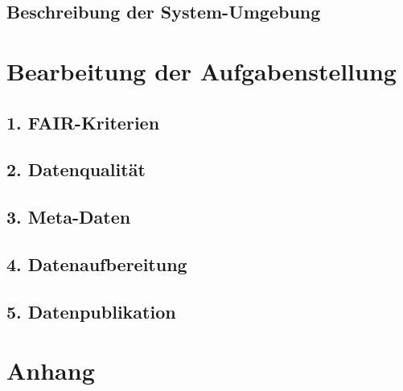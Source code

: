 \documentclass[12pt,a4paper,toc=bibliographynumbered,toc=indenttextentries]{scrreprt}
\begin{document}
		\section{Beschreibung der System-Umgebung}
		
		
	\chapter{Bearbeitung der Aufgabenstellung}
		
		\section*{1. FAIR-Kriterien}
	
		\section*{2. Datenqualität}
	
		\section*{3. Meta-Daten}
	
		\section*{4. Datenaufbereitung}
	
		\section*{5. Datenpublikation}
				
	\chapter{Anhang}
	
\end{document}
